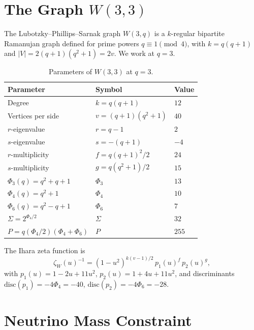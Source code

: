 \documentclass[12pt]{article}
\begin{document}
\section{The Graph $W(3,3)$}
\label{sec:graph}

The Lubotzky--Phillips--Sarnak graph $W(3,q)$ \cite{LPS1988} is a
$k$-regular bipartite Ramanujan graph defined for prime powers
$q\equiv 1\pmod{4}$, with $k=q(q+1)$ and $|V|=2(q+1)(q^2+1)=2v$.
We work at $q=3$.

\begin{table}[h]
\centering
\begin{tabular}{lll}
\toprule
Parameter & Symbol & Value \\
\midrule
Degree              & $k=q(q+1)$          & $12$ \\
Vertices per side   & $v=(q+1)(q^2+1)$    & $40$ \\
$r$-eigenvalue      & $r=q-1$             & $2$ \\
$s$-eigenvalue      & $s=-(q+1)$          & $-4$ \\
$r$-multiplicity    & $f=q(q+1)^2/2$      & $24$ \\
$s$-multiplicity    & $g=q(q^2+1)/2$      & $15$ \\
$\Phi_3(q)=q^2+q+1$ & $\Phi_3$            & $13$ \\
$\Phi_4(q)=q^2+1$   & $\Phi_4$            & $10$ \\
$\Phi_6(q)=q^2-q+1$ & $\Phi_6$            & $7$ \\
$\Sigma=2^{\Phi_4/2}$& $\Sigma$            & $32$ \\
$P=q(\Phi_4/2)(\Phi_4{+}\Phi_6)$ & $P$ & $255$ \\
\bottomrule
\end{tabular}
\caption{Parameters of $W(3,3)$ at $q=3$.}
\end{table}

The Ihara zeta function is
\[
  \zeta_{W}(u)^{-1} = (1-u^2)^{k(v-1)/2}\,p_1(u)^f\,p_2(u)^g,
\]
with $p_1(u)=1-2u+11u^2$, $p_2(u)=1+4u+11u^2$,
and discriminants $\mathrm{disc}(p_1)=-4\Phi_4=-40$,
$\mathrm{disc}(p_2)=-4\Phi_6=-28$.





\section{Neutrino Mass Constraint}
\label{sec:neutrino}
\end{document}
